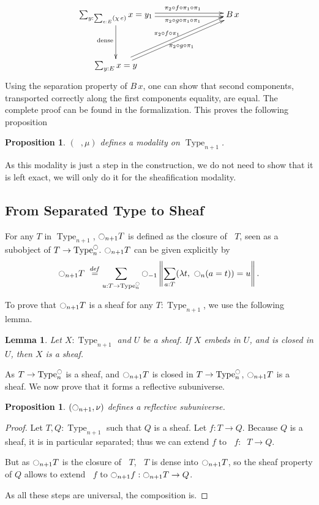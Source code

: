 \documentclass[preprint,9pt,numbers]{sigplanconf}
\newtheorem{prop}[thm]{Proposition}
\newtheorem{lem}[thm]{Lemma}
\newcommand \defeq {\overset{de\hspace{-0.2ex}f}{=}}
\newcommand{\mynote}[2]{
    \fbox{\bfseries\sffamily\scriptsize#1}
    {\small$\blacktriangleright$\textsf{\emph{#2}}$\blacktriangleleft$}~}
\newcommand\nt[1]{\mynote{NT}{#1}}
\DeclareMathOperator{\Type}{Type}
\newcommand{\modal}{\ensuremath{\ocircle}}
\newcommand \separated {\mathop{\square_{n+1}} }
\newenvironment{mymath}[1][-0em]{%
  \newcommand\mymathaux{\vspace{#1}}%
  \vspace{#1}%
  \begin{equation*}%
  }{ %
    \mymathaux%
  \end{equation*}}
\begin{document}
\begin{mymath}\xymatrix@C=8em@R=4em{
  \sum_{y:\sum_{e:E} (\chi\,
  e)} x=y_1 \ar@<2pt>[r]^{\qquad \pi_2\circ f\circ\pi_1\circ \pi_1}
\ar@<-2pt>[r]_{\qquad \pi_2\circ g\circ \pi_1\circ \pi_1}
\ar[d]_{\mathrm{dense}}& B\,x \\
  \sum_{y:E} x = y \ar@<2pt>[ur]^{\pi_2\circ f\circ \pi_1} \ar@<-2pt>[ur]_{\pi_2\circ g\circ \pi_1}&
}\end{mymath}%
Using the separation property of $B\,x$, one can show that second
components, transported correctly along the first components equality,
are equal. The complete proof can be found in the formalization.
This proves the following proposition
\begin{prop}\label{prop:sep-mod}
  $(\separated,\mu)$ defines a modality on $\Type_{n+1}$.
\end{prop}

As this modality is just a step in the construction, we do not need to
show that it is left exact, we will only do it for the sheafification
modality.

\subsection{From Separated Type to Sheaf}
\label{ssec:separated-to-sheaf}

For any $T$ in $\Type_{n+1}$, 
$\modal_{n+1}T$ is defined as the closure of $\separated T$,
seen as a subobject of $T \to \Type_n^\modal$. 
%
$\modal_{n+1}T$ can be given explicitly by
\begin{mymath}
\modal_{n+1} T \ \defeq \sum_{u:T \to \Type_n^\modal} \modal_{-1}\left\| \sum_{a:T} 
            (\lambda t,~\modal_n (a=t)) = u\right\|.
\end{mymath}%

To prove that $\modal_{n+1} T$ is a sheaf for any $T:\Type_{n+1}$, we
use the following lemma.
\begin{lem}
  Let $X:\Type_{n+1}$ and $U$ be a sheaf. If $X$ embeds
  in $U$, and is closed in $U$, then $X$ is a sheaf.
\end{lem}

As $T\to \Type_n^\modal$ is a sheaf, and $\modal_{n+1}T$ is closed in
$T\to \Type_n^\modal$, $\modal_{n+1}T$ is a sheaf. We now prove that
it forms a reflective subuniverse.

\begin{prop}
  $(\modal_{n+1},\nu)$ defines a reflective subuniverse.
\end{prop}
\begin{proof}
  Let $T,Q:\Type_{n+1}$ such that $Q$ is a sheaf. Let $f:T\to Q$.
  Because $Q$ is a sheaf, it is in particular separated;
  thus we can extend $f$ to $\separated f:\separated T\to Q$.

  But as $\modal_{n+1} T$ is the closure of $\separated T$, $\separated T$ is dense
  into $\modal_{n+1} T$, so the sheaf property of $Q$ allows to extend
  $\separated f$ to $\modal_{n+1} f:\modal_{n+1} T \to Q$.

  As all these steps are universal, the composition is.
\end{proof}
\end{document}
